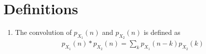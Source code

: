 \documentclass[journal,12pt,onecolumn]{IEEEtran}
\renewcommand\thesection{\arabic{section}}
\providecommand{\sbrak}[1]{\ensuremath{{}\left[#1\right]}}
\providecommand{\brak}[1]{\ensuremath{\left(#1\right)}}
\theoremstyle{remark}
\providecommand{\abs}[1]{\left\vert#1\right\vert}
\providecommand{\system}[1]{\overset{\mathcal{#1}}{ \longleftrightarrow}}
\numberwithin{equation}{section}
\begin{document}
 \section{Definitions}
\begin{enumerate}[label=\arabic*.,ref=\thesection.\theenumi]
\item The convolution  of 
	$ p_{X_1}(n)$ and $p_{X_2}(n)$ is defined as 
\begin{align}
	 p_{X_1}(n)*p_{X_2}(n) = 
	\sum_{k}^{}p_{X_1}(n-k)p_{X_2}(k)  
\end{align}

\end{enumerate}
\end{document}
